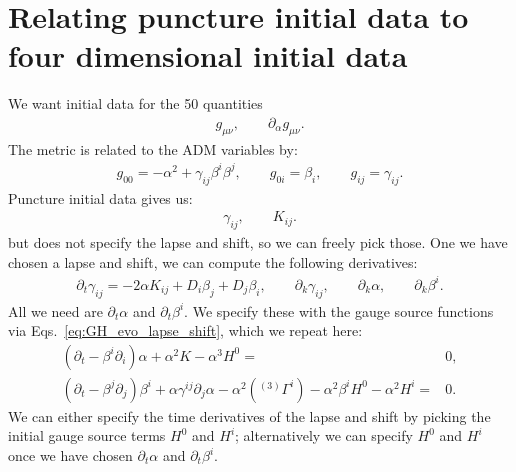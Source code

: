 \documentclass[%
notitlepage,
report,
nofootinbib,
 amsmath,amssymb,
 aps,
]{revtex4-1}
\begin{document}
\section{Relating puncture initial data to four dimensional initial data}
We want initial data for the 50 quantities
\begin{align}
   g_{\mu\nu},\qquad\partial_{\alpha}g_{\mu\nu}
   .
\end{align}
The metric is related to the ADM variables by:
\begin{subequations}
\begin{align}
   g_{00}
   =
   -  
   \alpha^2
   +
   \gamma_{ij}\beta^i\beta^j
   ,\qquad
   g_{0i}
   =
   \beta_i
   ,\qquad
   g_{ij}
   =
   \gamma_{ij}
   .
\end{align}
\end{subequations}
Puncture initial data gives us:
\begin{align}
   \gamma_{ij},\qquad K_{ij}
   .
\end{align}
but does not specify the lapse and shift, so we can freely pick those.
One we have chosen a lapse and shift, we can compute the following derivatives:
\begin{subequations}
\begin{align}
   \partial_t\gamma_{ij}
   =
   -
   2\alpha K_{ij}
   +
   D_i\beta_j
   +
   D_j\beta_i
   ,\qquad
   \partial_k\gamma_{ij}
   ,\qquad
   \partial_k\alpha
   ,\qquad
   \partial_k\beta^i
   .
\end{align}
\end{subequations}
All we need are $\partial_t\alpha$ and $\partial_t\beta^i$.
We specify these with the gauge source functions via
Eqs.~\eqref{eq:GH_evo_lapse_shift}, which we repeat here:
\begin{subequations}
\begin{align}
   \left(
      \partial_t
   -  \beta^i\partial_i
   \right)
   \alpha
   +  \alpha^2K
   -  \alpha^3H^0
   =&
   0
   ,\\
   \left(
      \partial_t
   -  \beta^j\partial_j
   \right)
   \beta^i
+  \alpha\gamma^{ij}\partial_j\alpha
-  \alpha^2\left({}^{(3)}\Gamma^i\right)
-  \alpha^2\beta^iH^0
-  \alpha^2H^i
   =&
   0
   .
\end{align}   
\end{subequations}
We can either specify the time derivatives of the lapse and shift
by picking the initial gauge source terms $H^0$ and $H^i$;
alternatively we can specify $H^0$ and $H^i$ once we have chosen
$\partial_t\alpha$ and $\partial_t\beta^i$.
\end{document}
